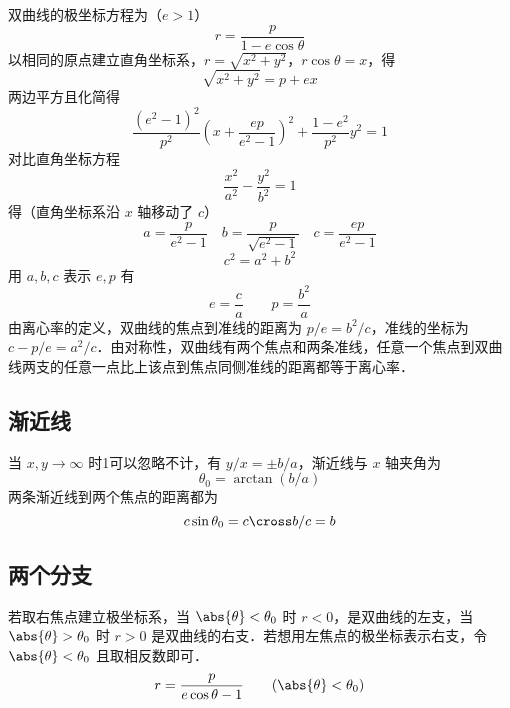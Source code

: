 
双曲线的极坐标方程为（$e>1$）
\begin{equation}
r = \frac{p}{{1 - e\cos \theta }}
\end{equation}
以相同的原点建立直角坐标系，$r = \sqrt {{x^2} + {y^2}}$，$r\cos \theta  = x$，得
\begin{equation}
\sqrt {{x^2} + {y^2}}  = p + ex
\end{equation}
两边平方且化简得
\begin{equation}
\frac{{{{({e^2} - 1)}^2}}}{{{p^2}}}{\left( {x + \frac{{ep}}{{{e^2} - 1}}} \right)^2} + \frac{{1 - {e^2}}}{{{p^2}}}{y^2} = 1
\end{equation}
对比直角坐标方程
\begin{equation}
\frac{{{x^2}}}{{{a^2}}} - \frac{{{y^2}}}{{{b^2}}} = 1
\end{equation}
得（直角坐标系沿 $x$ 轴移动了 $c$）
\begin{equation}
a = \frac{p}{{{e^2} - 1}} \quad  b = \frac{p}{{\sqrt {{e^2} - 1} }} \quad c = \frac{{ep}}{{{e^2} - 1}}
\end{equation}
\begin{equation}
c^2 = a^2 + b^2
\end{equation}
用 $a, b, c$ 表示 $e,p$ 有
\begin{equation}
e = \frac{c}{a} \qquad p = \frac{{{b^2}}}{a}
\end{equation}
由离心率的定义，双曲线的焦点到准线的距离为 $p/e=b^2/c$，准线的坐标为 $c-p/e = a^2/c$．由对称性，双曲线有两个焦点和两条准线，任意一个焦点到双曲线两支的任意一点比上该点到焦点同侧准线的距离都等于离心率．


\subsection{渐近线}
当 $x,y\to \infty$ 时1可以忽略不计，有 $y/x = \pm b/a$，渐近线与 $x$ 轴夹角为
\begin{equation}
\theta_0 = \arctan(b/a)
\end{equation}
两条渐近线到两个焦点的距离都为
\begin{equation}
c\sin\theta_0 = c\cross b/c = b
\end{equation}

\subsection{两个分支}
若取右焦点建立极坐标系，当 $\abs{\theta}<\theta_0$ 时 $r<0$，是双曲线的左支，当 $\abs{\theta}>\theta_0$ 时 $r>0$ 是双曲线的右支．若想用左焦点的极坐标表示右支，令 $\abs{\theta}<\theta_0$ 且取相反数即可．
\begin{equation}
r = \frac{p}{{e\cos \theta -1}} \qquad (\abs{\theta}<\theta_0)
\end{equation}










